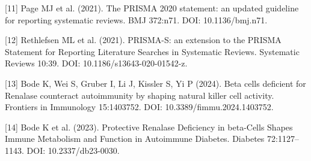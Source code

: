 \documentclass[11pt,letterpaper]{article}
\begin{document}
{\small [11] Page MJ et al. (2021). The PRISMA 2020 statement: an updated guideline for reporting systematic reviews. BMJ 372:n71. DOI: 10.1136/bmj.n71.\par}
{\small [12] Rethlefsen ML et al. (2021). PRISMA-S: an extension to the PRISMA Statement for Reporting Literature Searches in Systematic Reviews. Systematic Reviews 10:39. DOI: 10.1186/s13643-020-01542-z.\par}
{\small [13] Bode K, Wei S, Gruber I, Li J, Kissler S, Yi P (2024). Beta cells deficient for Renalase counteract autoimmunity by shaping natural killer cell activity. Frontiers in Immunology 15:1403752. DOI: 10.3389/fimmu.2024.1403752.\par}
{\small [14] Bode K et al. (2023). Protective Renalase Deficiency in beta-Cells Shapes Immune Metabolism and Function in Autoimmune Diabetes. Diabetes 72:1127--1143. DOI: 10.2337/db23-0030.\par}
\end{document}
